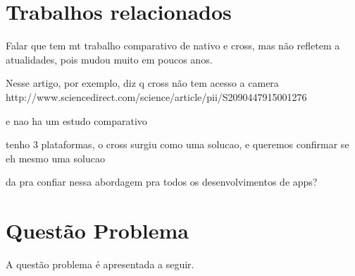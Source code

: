 \section{Trabalhos relacionados} \label{sec:trabalhosrelacionados}
Falar que tem mt trabalho comparativo de nativo e cross, mas não refletem a atualidades, pois mudou muito em poucos anos.

Nesse artigo, por exemplo, diz q cross não tem acesso a camera http://www.sciencedirect.com/science/article/pii/S2090447915001276

e nao ha um estudo comparativo



tenho 3 plataformas, o cross surgiu como uma solucao, e queremos confirmar se eh mesmo uma solucao

da pra confiar nessa abordagem pra todos os desenvolvimentos de apps?



 
\section{Questão Problema} \label{sec:questaoproblema}

A questão problema é apresentada a seguir.

